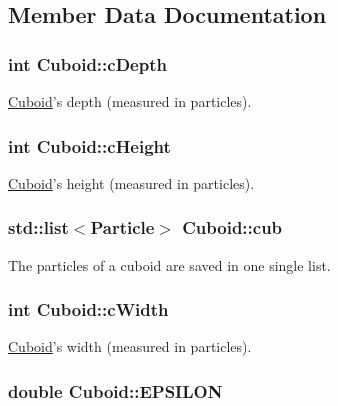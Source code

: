 \subsection{Member Data Documentation}
\hypertarget{classCuboid_a9f6823cdaa2bbb8df9ea1a8709a3319c}{
\subsubsection[{c\-Depth}]{\setlength{\rightskip}{0pt plus 5cm}int Cuboid\-::c\-Depth\hspace{0.3cm}{\ttfamily [private]}}}\label{classCuboid_a9f6823cdaa2bbb8df9ea1a8709a3319c}
\hyperlink{classCuboid}{Cuboid}'s depth (measured in particles). \hypertarget{classCuboid_a774275af1874294d9d12772eaa7d417a}{
\subsubsection[{c\-Height}]{\setlength{\rightskip}{0pt plus 5cm}int Cuboid\-::c\-Height\hspace{0.3cm}{\ttfamily [private]}}}\label{classCuboid_a774275af1874294d9d12772eaa7d417a}
\hyperlink{classCuboid}{Cuboid}'s height (measured in particles). \hypertarget{classCuboid_a46268af723f395a1cb00533cc8dab6c8}{
\subsubsection[{cub}]{\setlength{\rightskip}{0pt plus 5cm}std\-::list$<${\bf Particle}$>$ Cuboid\-::cub\hspace{0.3cm}{\ttfamily [private]}}}\label{classCuboid_a46268af723f395a1cb00533cc8dab6c8}
The particles of a cuboid are saved in one single list. \hypertarget{classCuboid_a256b9679e10b33f8e280034a6a7de6e8}{
\subsubsection[{c\-Width}]{\setlength{\rightskip}{0pt plus 5cm}int Cuboid\-::c\-Width\hspace{0.3cm}{\ttfamily [private]}}}\label{classCuboid_a256b9679e10b33f8e280034a6a7de6e8}
\hyperlink{classCuboid}{Cuboid}'s width (measured in particles). \hypertarget{classCuboid_a3925eb122d69d5938939945a961dc96f}{
\subsubsection[{E\-P\-S\-I\-L\-O\-N}]{\setlength{\rightskip}{0pt plus 5cm}double Cuboid\-::\-E\-P\-S\-I\-L\-O\-N\hspace{0.3cm}{\ttfamily [private]}}}\label{classCuboid_a3925eb122d69d5938939945a961dc96f}
